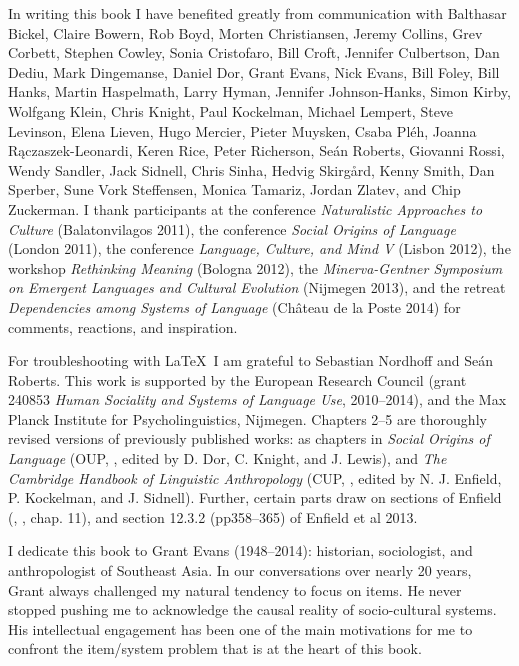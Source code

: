 
In writing this book I have benefited greatly from communication with Balthasar Bickel, Claire Bowern, Rob 
Boyd, Morten Christiansen, Jeremy Collins, Grev Corbett, Stephen Cowley, Sonia Cristofaro, Bill Croft, Jennifer Culbertson, Dan Dediu, Mark Dingemanse, Daniel Dor, Grant Evans\dag, Nick Evans, Bill Foley, Bill Hanks, Martin Haspelmath, Larry Hyman, Jennifer Johnson-Hanks, Simon Kirby, Wolfgang Klein, Chris Knight, Paul Kockelman, Michael Lempert, Steve Levinson, Elena Lieven, Hugo Mercier, Pieter Muysken, Csaba Pl\'{e}h, Joanna R\k{a}czaszek-Leonardi, Keren Rice, Peter Richerson, Se\'{a}n Roberts, Giovanni Rossi, Wendy Sandler, Jack Sidnell, Chris Sinha, Hedvig Skirg\aa{}rd, Kenny Smith, Dan Sperber, Sune Vork Steffensen, Monica Tamariz, Jordan Zlatev, and Chip Zuckerman. I thank participants at the conference 
\textit{Naturalistic Approaches to Culture} (Balatonvilagos 2011), the 
conference \textit{Social Origins of Language} (London 2011), the 
conference \textit{Language, Culture, and Mind V} (Lisbon 2012), the workshop 
\textit{Rethinking Meaning} (Bologna 2012), the \textit{Minerva-Gentner Symposium on 
Emergent Languages and Cultural Evolution} (Nijmegen 2013), and the retreat \textit{Dependencies among Systems of Language} (Ch\^{a}teau de la Poste 2014) for comments, reactions, and inspiration. 

For troubleshooting with \LaTeX\ I am grateful to Sebastian Nordhoff and Se\'{a}n Roberts. This work is supported by the European Research Council 
(grant 240853 \textit{Human Sociality and Systems of Language Use}, 2010--2014), and 
the Max Planck Institute for Psycholinguistics, Nijmegen. Chapters 2--5 are thoroughly revised versions of previously published works: as chapters in 
\textit{Social Origins of Language} (OUP, \citeyear{DorEtAl2014}, edited by D. Dor, C. Knight, and J. Lewis), and \textit{The Cambridge Handbook of Linguistic Anthropology} 
(CUP, \citeyear{EnfieldEtAl2014handbookla}, edited by N. J. Enfield, P. Kockelman, and J. Sidnell). Further, certain parts draw on sections of Enfield (\citeyear{enfield_transmission_2008}, \citeyear{enfield_relationship_2013}, 
chap. 11), and section 12.3.2 (pp358--365) of Enfield et al 2013. 

I dedicate this book to Grant Evans (1948--2014): historian, sociologist, and anthropologist of Southeast Asia. In our conversations over nearly 20 years, Grant always challenged my natural tendency to focus on items. He never stopped pushing me to acknowledge the causal reality of socio-cultural systems. His intellectual engagement has been one of the main motivations for me to confront the item/system problem that is at the heart of this book.